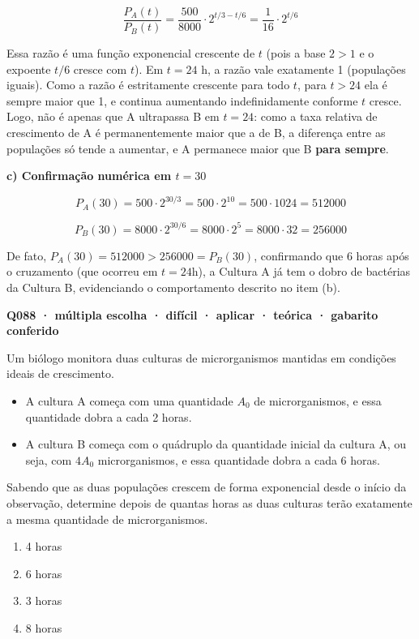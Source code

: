 \documentclass[11pt,a4paper]{article}
\begin{document}
$$\frac{P_A(t)}{P_B(t)} = \frac{500}{8000}\cdot 2^{t/3 - t/6} = \frac{1}{16}\cdot 2^{t/6}$$

Essa razão é uma função exponencial crescente de $t$ (pois a base $2>1$ e o expoente $t/6$ cresce com $t$). Em $t=24$ h, a razão vale exatamente 1 (populações iguais). Como a razão é estritamente crescente para todo $t$, para $t>24$ ela é sempre maior que 1, e continua aumentando indefinidamente conforme $t$ cresce. Logo, não é apenas que A ultrapassa B em $t=24$: como a taxa relativa de crescimento de A é permanentemente maior que a de B, a diferença entre as populações só tende a aumentar, e A permanece maior que B \textbf{para sempre}.

\textbf{c) Confirmação numérica em $t=30$}

$$P_A(30) = 500 \cdot 2^{30/3} = 500 \cdot 2^{10} = 500 \cdot 1024 = 512000$$

$$P_B(30) = 8000 \cdot 2^{30/6} = 8000 \cdot 2^{5} = 8000 \cdot 32 = 256000$$

De fato, $P_A(30) = 512000 > 256000 = P_B(30)$, confirmando que 6 horas após o cruzamento (que ocorreu em $t=24$h), a Cultura A já tem o dobro de bactérias da Cultura B, evidenciando o comportamento descrito no item (b).

\bigskip\noindent\textbf{Q088 · múltipla escolha · difícil · aplicar · teórica · gabarito conferido}\par\nopagebreak
Um biólogo monitora duas culturas de microrganismos mantidas em condições ideais de crescimento.

\begin{itemize}[nosep,leftmargin=*]
\item A cultura A começa com uma quantidade $A_0$ de microrganismos, e essa quantidade dobra a cada 2 horas.
\item A cultura B começa com o quádruplo da quantidade inicial da cultura A, ou seja, com $4A_0$ microrganismos, e essa quantidade dobra a cada 6 horas.
\end{itemize}

Sabendo que as duas populações crescem de forma exponencial desde o início da observação, determine depois de quantas horas as duas culturas terão exatamente a mesma quantidade de microrganismos.
\begin{enumerate}[label=(\alph*)]
\item 4 horas
\item 6 horas
\item 3 horas
\item 8 horas
\end{enumerate}
\end{document}
